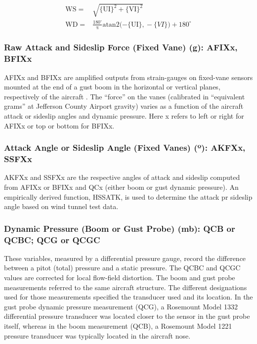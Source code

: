 \documentclass[
]{book}
\begin{document}
\begin{align}
\mathrm{WS} = & \sqrt{\mathrm{\{UI\}^{2}+\{VI\}^{2}}} \label{eq:WSobs}\\
\mathrm{WD} = & \mathrm{\frac{180^{\circ}}{\pi}atan2(-\{UI\},}-\{VI\})+180^{\circ}
\label{eq:WDobs}
\end{align}

\hypertarget{vanes}{%
\subsubsection*{Raw Attack and Sideslip Force (Fixed Vane) (g): AFIXx, BFIXx}\label{vanes}}

AFIXx and BFIXx are amplified outputs from strain-gauges on fixed-vane sensors mounted at the end of a gust boom in the horizontal or vertical planes, respectively of the aircraft . The ``force'' on the vanes (calibrated in ``equivalent grams'' at Jefferson County Airport gravity) varies as a function of the aircraft attack or sideslip angles and dynamic pressure. Here x refers to left or right for AFIXx or top or bottom for BFIXx.

\hypertarget{akfxx}{%
\subsubsection*{\texorpdfstring{Attack Angle or Sideslip Angle (Fixed Vanes) ({º}): AKFXx, SSFXx}{Attack Angle or Sideslip Angle (Fixed Vanes) (º): AKFXx, SSFXx}}\label{akfxx}}

AKFXx and SSFXx are the respective angles of attack and sideslip computed from AFIXx or BFIXx and QCx (either boom or gust dynamic pressure). An empirically derived function, HSSATK, is used to determine the attack pr sideslip angle based on wind tunnel test data.

\hypertarget{qcb}{%
\subsubsection*{Dynamic Pressure (Boom or Gust Probe) (mb): QCB or QCBC; QCG or QCGC}\label{qcb}}

These variables, measured by a differential pressure gauge, record the difference between a pitot (total) pressure and a static pressure. The QCBC and QCGC values are corrected for local flow-field distortion. The boom and gust probe measurements referred to the same aircraft structure. The different designations used for those measurements specified the transducer used and its location. In the gust probe dynamic pressure measurement (QCG), a Rosemount Model 1332 differential pressure transducer was located closer to the sensor in the gust probe itself, whereas in the boom measurement (QCB), a Rosemount Model 1221 pressure transducer was typically located in the aircraft nose.
\end{document}
